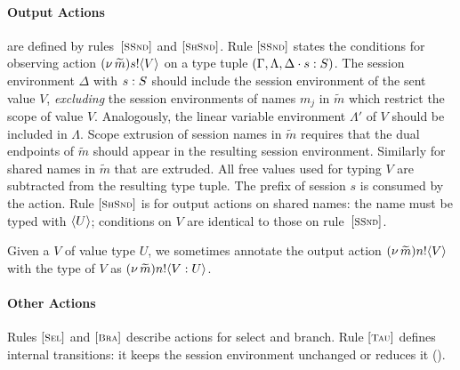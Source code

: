 \paragraph{Output Actions} are defined by rules~${[\text{\footnotesize \textsc{SSnd}}]}$
and ${[\text{\footnotesize \textsc{ShSnd}}]}$.  
Rule ${[\text{\footnotesize \textsc{SSnd}}]}$ states the conditions for observing action
$(\nu\, \widetilde{m}) s ! \langle V \rangle$ on a type tuple 
$(\Gamma, \Lambda, \Delta\cdot s : S)$. 
The session environment $\Delta$ with $s : S$ 
should include the session environment of the sent value $V$, 
{\em excluding} the session environments of names $m_j$ 
in $\widetilde{m}$ which restrict the scope of value $V$. 
Analogously, the linear variable environment 
$\Lambda'$ of $V$ should be included in $\Lambda$. 
Scope extrusion of session names in $\widetilde{m}$ requires
that the dual endpoints of $\widetilde{m}$ should appear in
the resulting session environment. Similarly for shared 
names in $\widetilde{m}$ that are extruded.  
All free values used for typing $V$ are subtracted from the
resulting type tuple. The prefix of session $s$ is consumed
by the action.
Rule ${[\text{\footnotesize \textsc{ShSnd}}]}$ is for output actions on shared names:
the name must be typed with $\langle U \rangle$; conditions on $V$ are identical to those
on rule~${[\text{\footnotesize \textsc{SSnd}}]}$.

\begin{notation}
Given a $V$ of value type $U$, we sometimes annotate the output action 
$(\nu\, \widetilde{m}) n ! \langle V \rangle$
with the type of $V$ 
as $(\nu\, \widetilde{m}) n ! \langle V : U \rangle$.
\end{notation}

\paragraph{Other Actions}
Rules ${[\text{\footnotesize \textsc{Sel}}]}$ and ${[\text{\footnotesize \textsc{Bra}}]}$ describe actions for
select and branch.
Rule ${[\text{\footnotesize \textsc{Tau}}]}$ defines
internal transitions: 
it keeps the session environment unchanged or 
reduces it ().

